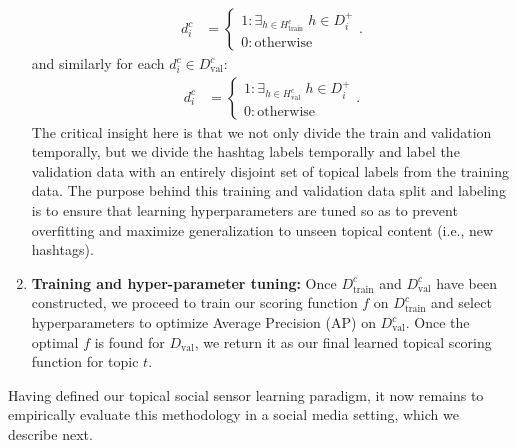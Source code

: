 \begin{enumerate}
\begin{align*}
d_{i}^{c} & =
  \begin{cases}
    1: \exists_{h \in H^c_\mathrm{train}} \; h \in D_i^+ \\
    0: \mathrm{otherwise}
  \end{cases} .
\end{align*}
and similarly for each $d_{i}^{c} \in D^c_\mathrm{val}$:
\begin{align*}
d_{i}^{c} & =
  \begin{cases}
    1: \exists_{h \in H^c_\mathrm{val}} \; h \in D_i^+ \\
    0: \mathrm{otherwise}
  \end{cases} .
\end{align*}
The critical insight here is that we not only divide the train and validation
temporally, but we divide the hashtag labels temporally and label the validation
data with an entirely disjoint set of topical labels from the training data.
The purpose behind this training and validation data split
and labeling is to ensure that learning hyperparameters are tuned so as
to prevent overfitting and maximize generalization to unseen topical
content (i.e., new hashtags).
\item {\bf Training and hyper-parameter tuning:}
Once $D^c_\mathrm{train}$ and $D^c_\mathrm{val}$ have been constructed,
we proceed to train our scoring function $f$ on $D^c_\mathrm{train}$ and
select hyperparameters to optimize Average Precision (AP) on
$D^c_\mathrm{val}$.  Once the optimal $f$ is found for $D_\mathrm{val}$,
we return it as our final learned topical scoring function for topic $t$.
\end{enumerate}
Having defined our topical social sensor learning paradigm, it now remains
to empirically evaluate this methodology in a social media setting, which
we describe next.
